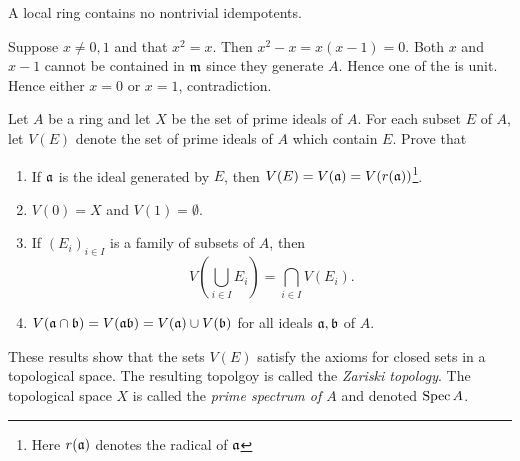 \documentclass[11pt, english]{article}
\begin{document}
\begin{exc}[Exercise 12]
A local ring contains no nontrivial idempotents.  
\end{exc}
\begin{sol}
Suppose $x \neq 0,1$ and that $x^2=x$. Then $x^2-x=x(x-1)=0$. Both $x$ and $x-1$ cannot be contained in $\mathfrak{m}$ since they generate $A$. Hence one of the is unit. Hence either $x=0$ or $x=1$, contradiction. 
\end{sol}

\begin{exc}

Let $A$ be a ring and let $X$ be the set of prime ideals of $A$. For each subset $E$ of $A$, let $V(E)$ denote the set of prime ideals of $A$ which contain $E$. Prove that
\begin{enumerate}
\item If $\mathfrak{a}$ is the ideal generated by $E$, then $V(E)=V(\mathfrak{a})=V(r(\mathfrak{a}))$\footnote{Here $r(\mathfrak{a})$ denotes the radical of $\mathfrak{a}$}.
\item $V(0)=X$ and $V(1)=\emptyset$.
\item If $(E_i)_{i \in I}$ is a family of subsets of $A$, then
\[
V\left( \bigcup_{i \in I} E_i \right) = \bigcap_{i \in I} V\left(E_i\right).
\]
\item $V(\mathfrak{a} \cap \mathfrak{b})=V(\mathfrak{a} \mathfrak{b})=V(\mathfrak{a}) \cup V(\mathfrak{b})$ for all ideals $\mathfrak{a},\mathfrak{b}$ of $A$.
\end{enumerate}
These results show that the sets $V(E)$ satisfy the axioms for closed sets in a topological space. The resulting topolgoy is called the \emph{Zariski topology}. The topological space $X$ is called the \emph{prime spectrum of $A$} and denoted $\operatorname{Spec} A$.
\end{exc}
\end{document}
